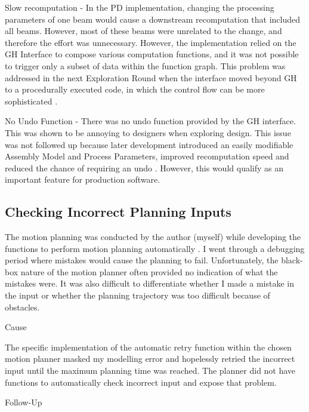 Slow recomputation - In the PD implementation, changing the processing parameters of one beam would cause a downstream recomputation that included all beams. However, most of these beams were unrelated to the change, and therefore the effort was unnecessary. However, the implementation relied on the GH Interface to compose various computation functions, and it was not possible to trigger only a subset of data within the function graph. This problem was addressed in the next Exploration Round when the interface moved beyond GH to a procedurally executed code, in which the control flow can be more sophisticated .

No Undo Function - There was no undo function provided by the GH interface. This was shown to be annoying to designers when exploring design. This issue was not followed up because later development introduced an easily modifiable Assembly Model and Process Parameters, improved recomputation speed and reduced the chance of requiring an undo . However, this would qualify as an important feature for production software. 

\subsection{Checking Incorrect Planning Inputs}
\label{subsection:exploration-2-checking-incorrect-planning-inputs}

The motion planning was conducted by the author (myself) while developing the functions to perform motion planning automatically . I went through a debugging period where mistakes would cause the planning to fail. Unfortunately, the black-box nature of the motion planner often provided no indication of what the mistakes were. It was also difficult to differentiate whether I made a mistake in the input or whether the planning trajectory was too difficult because of obstacles. 

Cause

The specific implementation of the automatic retry function within the chosen motion planner masked my modelling error and hopelessly retried the incorrect input until the maximum planning time was reached. The planner did not have functions to automatically check incorrect input and expose that problem.

Follow-Up


